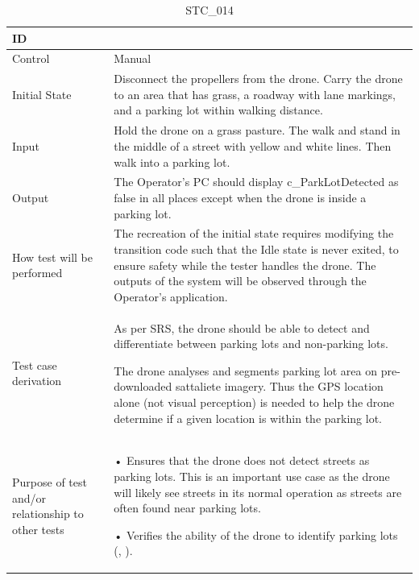 \documentclass[12pt, titlepage]{article}
\begin{document}
\begin{table}[!h]
\begin{center}
\caption {STC\_014}
\label{tab:STC_014}
\begin{tabular}{ | m{3.2cm} | m{12.2cm} | } 
\hline
ID & \nameref{tab:STC_014} \\ 
\hline
Control & Manual \\ 
\hline
Initial State & Disconnect the propellers from the drone. Carry the drone to an area that has grass,  a roadway with lane markings, and a parking lot within walking distance.  \\ 
\hline
Input & Hold the drone on a grass pasture. The walk and stand in the middle of a street with yellow and white lines. Then walk into a parking lot. \\ 
\hline
Output & The Operator's PC should display c\_ParkLotDetected as false in all places except when the drone is inside a parking lot. \\ 
\hline
How test will be performed & The recreation of the initial state requires modifying the transition code such that the Idle state is never exited, to ensure safety while the tester handles the drone. The outputs of the system will be observed through the Operator’s application. \\ 
\hline
Test case derivation & As per SRS, the drone should be able to detect and differentiate between parking lots and non-parking lots. 

The drone analyses and segments parking lot area on pre-downloaded sattaliete imagery. Thus the  GPS location alone (not visual perception) is needed to help the drone determine if a given location is within the parking lot.

 \\ 
\hline
Purpose of test and/or relationship to other tests & 
• Ensures that the drone does not detect streets as parking lots. This is an important use case as the drone will likely see streets in its normal operation as streets are often found near parking lots.

• Verifies the ability of the drone to identify parking lots (\nameref{GEN_001}, \nameref{SR_009}).
\\ 
\hline
\end{tabular}
\end{center}
\end{table}
\end{document}
